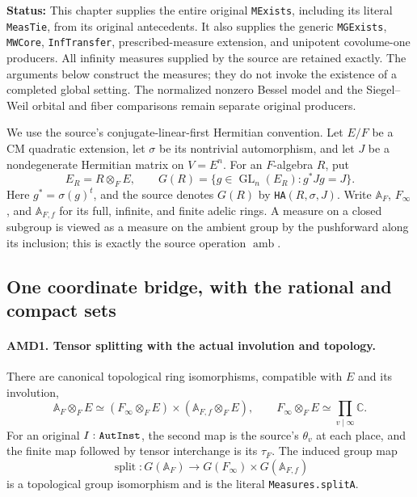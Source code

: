 \documentclass[11pt,a4paper]{article}
\numberwithin{equation}{section}
\theoremstyle{remark}\newtheorem{remark}[theorem]{Remark}
\newcommand{\status}[1]{\textbf{Status:} #1}
\begin{document}
\status{This chapter supplies the entire original \texttt{MExists},
including its literal \texttt{Meas\allowbreak Tie}, from its original antecedents.
It also supplies the generic \texttt{MGExists}, \texttt{MWCore},
\texttt{Inf\allowbreak Transfer}, prescribed-measure extension, and unipotent
covolume-one producers.  All infinity measures supplied by the source
are retained exactly.  The arguments below construct the measures;
they do not invoke the existence of a completed global setting.
The normalized nonzero Bessel model and the Siegel--Weil orbital and
fiber comparisons remain separate original producers.}

We use the source's conjugate-linear-first Hermitian convention.
Let \(E/F\) be a CM quadratic extension, let \(\sigma\) be its
nontrivial automorphism, and let \(J\) be a nondegenerate Hermitian
matrix on \(V=E^n\).  For an \(F\)-algebra \(R\), put
\[
 E_R=R\otimes_F E,\qquad
 G(R)=\{g\in\operatorname{GL}_n(E_R):g^*Jg=J\}.
 \tag{AMD.1}
\]
Here \(g^*=\sigma(g)^t\), and the source denotes \(G(R)\) by
\texttt{HA}\((R,\sigma,J)\).  Write \(\mathbb A_F\),
\(F_\infty\), and \(\mathbb A_{F,f}\) for its full, infinite,
and finite adelic rings.  A measure on a closed subgroup is viewed
as a measure on the ambient group by the pushforward along its
inclusion; this is exactly the source operation \(\operatorname{amb}\).

\subsection{One coordinate bridge, with the rational and compact sets}

\paragraph{AMD1. Tensor splitting with the actual involution and topology.}
\label{claim:AMD1}
There are canonical topological ring isomorphisms, compatible with
\(E\) and its involution,
\[
 \mathbb A_F\otimes_F E\simeq
 (F_\infty\otimes_F E)\times(\mathbb A_{F,f}\otimes_F E),
 \qquad
 F_\infty\otimes_F E\simeq\prod_{v\mid\infty}\mathbb C.
 \tag{AMD.2}
\]
For an original \(I:\texttt{Aut\allowbreak Inst}\), the second map is the
source's \(\theta_v\) at each place, and the finite map followed
by tensor interchange is its \(\tau_F\).  The induced group map
\[
 \operatorname{split}:G(\mathbb A_F)
       \longrightarrow G(F_\infty)\times G(\mathbb A_{F,f})
 \tag{AMD.3}
\]
is a topological group isomorphism and is the literal
\texttt{Measures.\allowbreak split\allowbreak A}.
\end{document}

